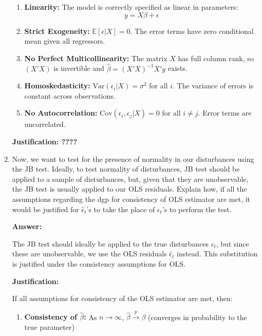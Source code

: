 \documentclass[12pt,a4paper]{article}
\begin{document}
\begin{enumerate}[label=(\alph*)]
      \begin{enumerate}
      \item \textbf{Linearity:} The model is correctly specified as linear in parameters:
      $$y = X\beta + \epsilon$$

      \item \textbf{Strict Exogeneity:} $\mathbb{E}[\epsilon | X] = 0$. The error terms have zero conditional mean given all regressors.

      \item \textbf{No Perfect Multicollinearity:} The matrix $X$ has full column rank, so $(X'X)$ is invertible and $\hat{\beta} = (X'X)^{-1}X'y$ exists.

      \item \textbf{Homoskedasticity:} $\text{Var}(\epsilon_i | X) = \sigma^2$ for all $i$. The variance of errors is constant across observations.

      \item \textbf{No Autocorrelation:} $\text{Cov}(\epsilon_i, \epsilon_j | X) = 0$ for all $i \neq j$. Error terms are uncorrelated.
      \end{enumerate}

    \textbf{Justification: ????}  
  
  \item Now, we want to test for the presence of normality in our disturbances using the JB test. Ideally, to test normality of disturbances, JB test should be applied to a sample of disturbances, but, given that they are unobservable, the JB test is usually applied to our OLS residuals. Explain how, if all the assumptions regarding the dgp for consistency of OLS estimator are met, it would be justified for $\hat{\epsilon}_t$'s to take the place of $\epsilon_t$'s to perform the test.
  
  \textbf{Answer:}

The JB test should ideally be applied to the true disturbances $\epsilon_t$, but since these are unobservable, we use the OLS residuals $\hat{\epsilon}_t$ instead. This substitution is justified under the consistency assumptions for OLS.

\textbf{Justification:}

If all assumptions for consistency of the OLS estimator are met, then:

\begin{enumerate}
\item \textbf{Consistency of $\hat{\beta}$:} As $n \to \infty$, $\hat{\beta} \xrightarrow{p} \beta$ (converges in probability to the true parameter)


\end{enumerate}
\end{enumerate}
\end{document}
